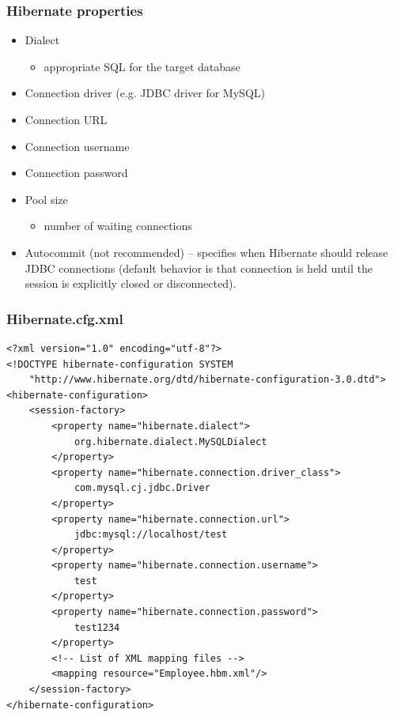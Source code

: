 \documentclass[10pt,xcolor=pdflatex]{beamer}
\begin{document}
\begin{frame}\frametitle{Hibernate properties}
	\begin{itemize}
		\item Dialect
          \begin{itemize}
        	\item appropriate SQL for the target database
          \end{itemize}
		\item Connection driver (e.g. JDBC driver for MySQL)
		\item Connection URL
		\item Connection username
		\item Connection password
		\item Pool size
          \begin{itemize}
        	\item number of waiting connections
          \end{itemize}
		\item Autocommit (not recommended) -- specifies when Hibernate should release JDBC connections (default behavior is that connection is held until the session is explicitly closed or disconnected).
	\end{itemize}
\end{frame}


\begin{frame}[fragile]\frametitle{Hibernate.cfg.xml}
\lstset{language=XML}
\begin{lstlisting}
<?xml version="1.0" encoding="utf-8"?>
<!DOCTYPE hibernate-configuration SYSTEM 
    "http://www.hibernate.org/dtd/hibernate-configuration-3.0.dtd">
<hibernate-configuration>
    <session-factory>
        <property name="hibernate.dialect">
            org.hibernate.dialect.MySQLDialect
        </property>
        <property name="hibernate.connection.driver_class">
            com.mysql.cj.jdbc.Driver
	    </property>
        <property name="hibernate.connection.url">
            jdbc:mysql://localhost/test
        </property>
        <property name="hibernate.connection.username">
            test
        </property>
        <property name="hibernate.connection.password">
            test1234
        </property>
        <!-- List of XML mapping files -->
        <mapping resource="Employee.hbm.xml"/>
    </session-factory>
</hibernate-configuration>
\end{lstlisting}
\end{frame}
\end{document}
